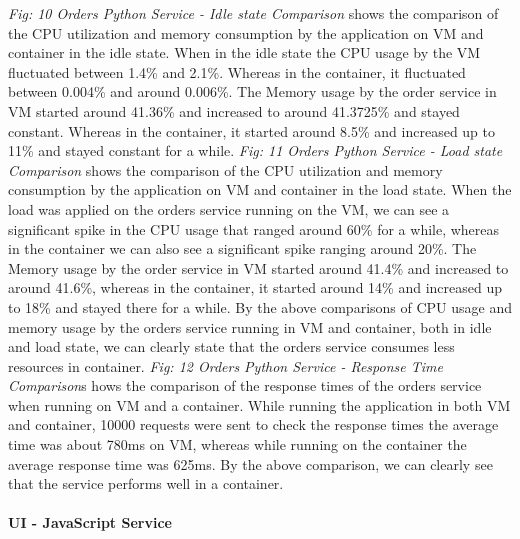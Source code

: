  \emph{Fig: 10 Orders Python Service - Idle state Comparison} shows the comparison of the CPU utilization and memory consumption by the application on VM and container in the idle state. When in the idle state the CPU usage by the VM fluctuated between 1.4\% and 2.1\%. Whereas in the container, it fluctuated between 0.004\% and around 0.006\%. The Memory usage by the order service in VM started around 41.36\% and increased to around 41.3725\% and stayed constant. Whereas in the container, it started around 8.5\% and increased up to 11\% and stayed constant for a while. \emph{Fig: 11 Orders Python Service - Load state Comparison} shows the comparison of the CPU utilization and memory consumption by the application on VM and container in the load state. When the load was applied on the orders service running on the VM, we can see a significant spike in the CPU usage that ranged around 60\% for a while, whereas in the container we can also see a significant spike ranging around 20\%. The Memory usage by the order service in VM started around 41.4\% and increased to around 41.6\%, whereas in the container, it started around 14\% and increased up to 18\% and stayed there for a while. By the above comparisons of CPU usage and memory usage by the orders service running in VM and container, both in idle and load state, we can clearly state that the orders service consumes less resources in container. \emph{Fig: 12 Orders Python Service - Response Time Comparison}s hows the comparison of the response times of the orders service when running on VM and a container. While running the application in both VM and container, 10000 requests were sent to check the response times the average time was about 780ms on VM, whereas while running on the container the average response time was 625ms. By the above comparison, we can clearly see that the service performs well in a container.  


\paragraph{ UI - JavaScript Service}

